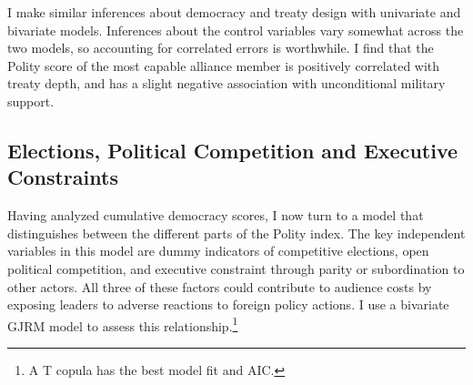 \documentclass[12pt]{article}
\begin{document}
I make similar inferences about democracy and treaty design with univariate and bivariate models.
Inferences about the control variables vary somewhat across the two models, so accounting for correlated errors is worthwhile.   
I find that the Polity score of the most capable alliance member is positively correlated with treaty depth, and has a slight negative association with unconditional military support.


\subsection{Elections, Political Competition and Executive Constraints} 


Having analyzed cumulative democracy scores, I now turn to a model that distinguishes between the different parts of the Polity index. 
The key independent variables in this model are dummy indicators of competitive elections, open political competition, and executive constraint through parity or subordination to other actors. 
All three of these factors could contribute to audience costs by exposing leaders to adverse reactions to foreign policy actions. 
I use a bivariate GJRM model to assess this relationship.\footnote{A T copula has the best model fit and AIC.} 
\end{document}
